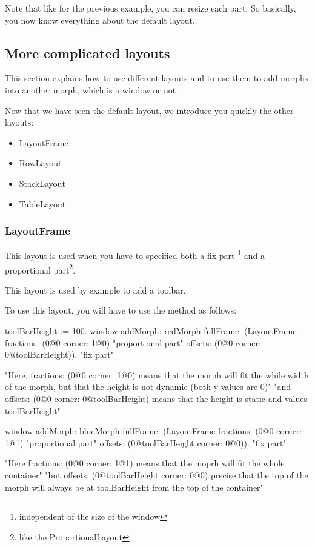 \documentclass[a4paper,10pt,twoside]{book}
\begin{document}
Note that like for the previous example, you can resize each part. So basically, you now know everything about the default layout.


%
%


\subsection{More complicated layouts}

This section explains how to use different layouts and to use them to add morphs into another morph, which is a window or not.

Now that we have seen the default layout, we introduce you quickly the other layouts:
\begin{itemize}
	\item LayoutFrame
	\item RowLayout
	\item StackLayout
	\item TableLayout
\end{itemize}

\subsubsection{LayoutFrame}

This layout is used when you have to specified both a fix part \footnote{independent of the size of the window} and a proportional part\footnote{like the ProportionalLayout}.

This layout is used by example to add a toolbar.

To use this layout, you will have to use the method  as follows:

\begin{code}{}
toolBarHeight := 100.
window
	addMorph: redMorph
	fullFrame: (LayoutFrame
				fractions: (0@0 corner: 1@0) "proportional part"
				offsets: (0@0 corner: 0@toolBarHeight)). "fix part"
				
				"Here, fractions: (0@0 corner: 1@0) means that the morph will fit the while width of the morph, but that the height is not dynamic (both y values are 0)"
				"and offsets: (0@0 corner: 0@toolBarHeight) means that the height is static and values toolBarHeight"
				
window
	addMorph: blueMorph
	fullFrame: (LayoutFrame
				fractions: (0@0 corner: 1@1) "proportional part"
				offsets: (0@toolBarHeight corner: 0@0)). "fix part"
				
	"Here fractions: (0@0 corner: 1@1) means that the moprh will	fit the whole container"
	"but offsets: (0@toolBarHeight corner: 0@0) precise that the top of the morph will always be at toolBarHeight from the top of the container"
\end{code}
\end{document}
